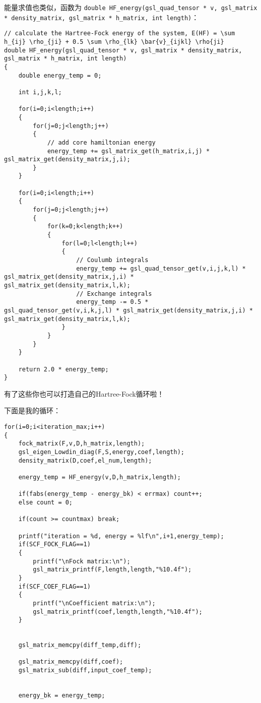 \documentclass[12pt,a4paper,openany,twoside]{article}
\numberwithin{equation}{section}
\begin{document}
                能量求值也类似，函数为 \lstinline$double HF_energy(gsl_quad_tensor * v, gsl_matrix * density_matrix, gsl_matrix * h_matrix, int length)$：
                \begin{lstlisting}
// calculate the Hartree-Fock energy of the system, E(HF) = \sum h_{ij} \rho_{ji} + 0.5 \sum \rho_{lk} \bar{v}_{ijkl} \rho{ji}
double HF_energy(gsl_quad_tensor * v, gsl_matrix * density_matrix, gsl_matrix * h_matrix, int length)
{
    double energy_temp = 0;

    int i,j,k,l;

    for(i=0;i<length;i++)
    {
        for(j=0;j<length;j++)
        {
            // add core hamiltonian energy
            energy_temp += gsl_matrix_get(h_matrix,i,j) * gsl_matrix_get(density_matrix,j,i);
        }
    }

    for(i=0;i<length;i++)
    {
        for(j=0;j<length;j++)
        {
            for(k=0;k<length;k++)
            {
                for(l=0;l<length;l++)
                {
                    // Coulumb integrals
                    energy_temp += gsl_quad_tensor_get(v,i,j,k,l) * gsl_matrix_get(density_matrix,j,i) * gsl_matrix_get(density_matrix,l,k);
                    // Exchange integrals
                    energy_temp -= 0.5 * gsl_quad_tensor_get(v,i,k,j,l) * gsl_matrix_get(density_matrix,j,i) * gsl_matrix_get(density_matrix,l,k);
                }
            }
        }
    }

    return 2.0 * energy_temp;
}
                \end{lstlisting}

                有了这些你也可以打造自己的Hartree-Fock循环啦！

                下面是我的循环：
                \begin{lstlisting}
for(i=0;i<iteration_max;i++)
{
    fock_matrix(F,v,D,h_matrix,length);
    gsl_eigen_Lowdin_diag(F,S,energy,coef,length);
    density_matrix(D,coef,el_num,length);     

    energy_temp = HF_energy(v,D,h_matrix,length);

    if(fabs(energy_temp - energy_bk) < errmax) count++;
    else count = 0;

    if(count >= countmax) break;

    printf("iteration = %d, energy = %lf\n",i+1,energy_temp);
    if(SCF_FOCK_FLAG==1)
    {
        printf("\nFock matrix:\n");
        gsl_matrix_printf(F,length,length,"%10.4f");
    }
    if(SCF_COEF_FLAG==1)
    {
        printf("\nCoefficient matrix:\n");
        gsl_matrix_printf(coef,length,length,"%10.4f");
    }


    gsl_matrix_memcpy(diff_temp,diff);

    gsl_matrix_memcpy(diff,coef);
    gsl_matrix_sub(diff,input_coef_temp);


    energy_bk = energy_temp;
                \end{lstlisting}
\end{document}
